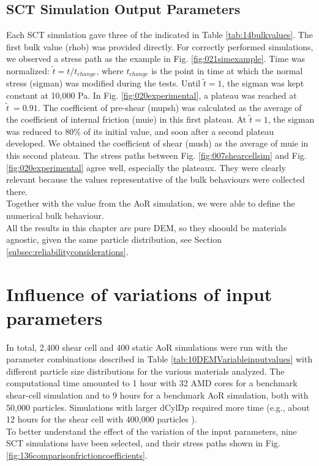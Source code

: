 \subsection{SCT Simulation Output Parameters}
\label{subsec:sctsimulationoutputparameters}


Each \acs{SCT} simulation gave three of the  indicated in
Table \ref{tab:14bulkvalues}.
The first bulk value (\acs{rhob}) was provided directly. 
For correctly performed simulations, we
observed a stress path as the example in Fig. \ref{fig:021simexample}.
Time was normalized: $\tilde{t} = t/t_{change}$, where $t_{change}$ is the
point in time at which the normal stress (\acs{sigman}) was modified during the
tests.
Until $\tilde{t}=1$, the \acs{sigman} was kept constant at 10,000 Pa.
In Fig. \ref{fig:020experimental},
a plateau was reached at $\tilde{t}~=0.91$.
The coefficient of pre-shear (\acs{mupsh}) was calculated as the average of the
coefficient of internal friction (\acs{muie}) in this first plateau.
At $\tilde{t}=1$, the \acs{sigman} was reduced to $80 \%$ of its initial
value, and soon after
a second plateau developed.
We obtained the coefficient of
shear (\acs{mush}) as the average of \acs{muie} in this second plateau.
The stress paths between Fig. \ref{fig:007shearcellsim} and Fig.
\ref{fig:020experimental} agree well, especially the plateaux.
They were clearly relevant because
the values representative of the bulk behaviours were collected there.\\
Together with the value from the \acs{AoR} simulation, we were able to define
the numerical bulk behaviour.\\
All the results in this chapter are pure \acs{DEM}, so they shoould be
materials agnostic, given the same particle distribution, see
Section \ref{subsec:reliabilityconsiderations}.



\section{Influence of variations of input parameters}
\label{sec:influence}

In total, 2,400 shear cell and 400 static \acs{AoR} simulations 
were run with
the parameter combinations described in Table
\ref{tab:10DEMVariableinputvalues} with different particle size
distributions for the various materials analyzed.
The computational time amounted to 1 hour with 32 AMD cores for a benchmark
shear-cell simulation and to 9 hours for a benchmark \acs{AoR} simulation, both with
50,000 particles.
Simulations with larger \acs{dCylDp} required more time (e.g., about 12 hours for
the shear cell with 400,000 particles ). \\
To better understand the effect of the variation of the input parameters, nine
\acs{SCT} simulations have been selected, and their stress paths shown in Fig.
\ref{fig:136comparisonfrictioncoefficients}.



